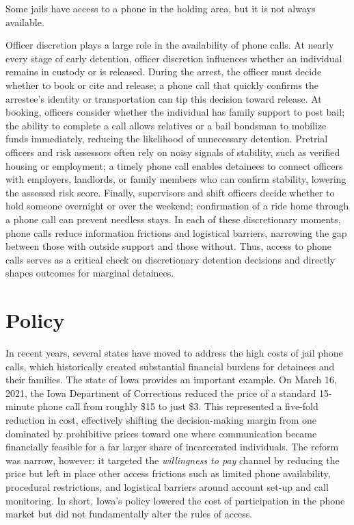 \documentclass[12pt, a4paper]{article}
\begin{document}
Some jails have access to a phone in the holding area, but it is not always available. 



Officer discretion plays a large role in the availability of phone calls. At nearly every stage of early detention, officer discretion influences whether an individual remains in custody or is released. During the arrest, the officer must decide whether to book or cite and release; a phone call that quickly confirms the arrestee’s identity or transportation can tip this decision toward release. At booking, officers consider whether the individual has family support to post bail; the ability to complete a call allows relatives or a bail bondsman to mobilize funds immediately, reducing the likelihood of unnecessary detention. Pretrial officers and risk assessors often rely on noisy signals of stability, such as verified housing or employment; a timely phone call enables detainees to connect officers with employers, landlords, or family members who can confirm stability, lowering the assessed risk score. Finally, supervisors and shift officers decide whether to hold someone overnight or over the weekend; confirmation of a ride home through a phone call can prevent needless stays. In each of these discretionary moments, phone calls reduce information frictions and logistical barriers, narrowing the gap between those with outside support and those without. Thus, access to phone calls serves as a critical check on discretionary detention decisions and directly shapes outcomes for marginal detainees.



\section{Policy}

In recent years, several states have moved to address the high costs of jail phone calls, which historically created substantial financial burdens for detainees and their families. The state of Iowa provides an important example. On March 16, 2021, the Iowa Department of Corrections reduced the price of a standard 15-minute phone call from roughly \$15 to just \$3. This represented a five-fold reduction in cost, effectively shifting the decision-making margin from one dominated by prohibitive prices toward one where communication became financially feasible for a far larger share of incarcerated individuals. The reform was narrow, however: it targeted the \textit{willingness to pay} channel by reducing the price but left in place other access frictions such as limited phone availability, procedural restrictions, and logistical barriers around account set-up and call monitoring. In short, Iowa's policy lowered the cost of participation in the phone market but did not fundamentally alter the rules of access.
\end{document}
